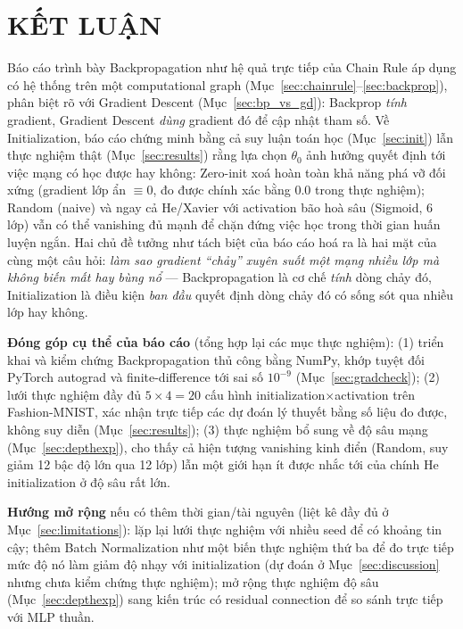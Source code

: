 \documentclass[12pt,a4paper]{report}
\begin{document}
\chapter*{KẾT LUẬN}

Báo cáo trình bày Backpropagation như hệ quả trực tiếp của Chain Rule áp
dụng có hệ thống trên một computational graph (Mục~\ref{sec:chainrule}--\ref{sec:backprop}),
phân biệt rõ với Gradient Descent (Mục~\ref{sec:bp_vs_gd}): Backprop
\emph{tính} gradient, Gradient Descent \emph{dùng} gradient đó để cập nhật
tham số. Về Initialization, báo cáo chứng minh bằng cả suy luận toán học
(Mục~\ref{sec:init}) lẫn thực nghiệm thật (Mục~\ref{sec:results}) rằng lựa
chọn $\theta_0$ ảnh hưởng quyết định tới việc mạng có học được hay không:
Zero-init xoá hoàn toàn khả năng phá vỡ đối xứng (gradient lớp ẩn $\equiv0$,
đo được chính xác bằng $0.0$ trong thực nghiệm); Random (naive) và ngay
cả He/Xavier với activation bão hoà sâu (Sigmoid, 6 lớp) vẫn có thể
vanishing đủ mạnh để chặn đứng việc học trong thời gian huấn luyện ngắn.
Hai chủ đề tưởng như tách biệt của báo cáo hoá ra là hai mặt của cùng một
câu hỏi: \emph{làm sao gradient ``chảy'' xuyên suốt một mạng nhiều lớp mà
không biến mất hay bùng nổ} --- Backpropagation là cơ chế \emph{tính}
dòng chảy đó, Initialization là điều kiện \emph{ban đầu} quyết định dòng
chảy đó có sống sót qua nhiều lớp hay không.

\textbf{Đóng góp cụ thể của báo cáo} (tổng hợp lại các mục thực nghiệm):
(1) triển khai và kiểm chứng Backpropagation thủ công bằng NumPy, khớp
tuyệt đối PyTorch autograd và finite-difference tới sai số $10^{-9}$
(Mục~\ref{sec:gradcheck}); (2) lưới thực nghiệm đầy đủ $5\times4=20$ cấu
hình initialization$\times$activation trên Fashion-MNIST, xác nhận trực
tiếp các dự đoán lý thuyết bằng số liệu đo được, không suy diễn
(Mục~\ref{sec:results}); (3) thực nghiệm bổ sung về độ sâu mạng
(Mục~\ref{sec:depthexp}), cho thấy cả hiện tượng vanishing kinh điển
(Random, suy giảm 12 bậc độ lớn qua 12 lớp) lẫn một giới hạn ít được nhắc
tới của chính He initialization ở độ sâu rất lớn.

\textbf{Hướng mở rộng} nếu có thêm thời gian/tài nguyên (liệt kê đầy đủ ở
Mục~\ref{sec:limitations}): lặp lại lưới thực nghiệm với nhiều seed để có
khoảng tin cậy; thêm Batch Normalization như một biến thực nghiệm thứ ba
để đo trực tiếp mức độ nó làm giảm độ nhạy với initialization (dự đoán ở
Mục~\ref{sec:discussion} nhưng chưa kiểm chứng thực nghiệm); mở rộng thực
nghiệm độ sâu (Mục~\ref{sec:depthexp}) sang kiến trúc có residual
connection để so sánh trực tiếp với MLP thuần.
\end{document}
